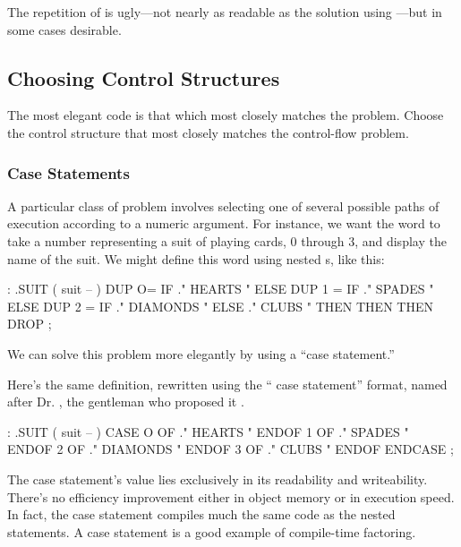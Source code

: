 The repetition of  is ugly---not nearly as readable as the
solution using ---but in some cases desirable.%
%
%

\subsection{Choosing Control Structures}%
\begin{tip}
The most elegant code is that which most closely matches the problem.
Choose the control structure that most closely matches the control-flow
problem.
\end{tip}%

\subsubsection{Case Statements}%
%

A particular class of problem involves selecting one of several possible
paths of execution according to a numeric argument. For instance, we
want the word  to take a number representing a suit of playing
cards, 0 through 3, and display the name of the suit. We might define this
word using nested s, like this:

\begin{Code}
: .SUIT ( suit -- )
  DUP  O=  IF ." HEARTS "   ELSE
  DUP  1 = IF ." SPADES "   ELSE
  DUP  2 = IF ." DIAMONDS " ELSE
              ." CLUBS "
  THEN THEN THEN  DROP ;
\end{Code}
We can solve this problem more elegantly by using a ``case statement.''

Here's the same definition, rewritten using the `` case
statement'' format, named after Dr. , the
gentleman who proposed it \cite{eaker}.

\begin{Code}
: .SUIT ( suit -- )
  CASE
  O OF   ." HEARTS "    ENDOF
  1 OF   ." SPADES "    ENDOF
  2 OF   ." DIAMONDS "  ENDOF
  3 OF   ." CLUBS "     ENDOF     ENDCASE ;
\end{Code}
The case statement's value lies exclusively in its readability and
writeability. There's no efficiency improvement either in object memory or
in execution speed. In fact, the case statement compiles much the same
code as the nested  statements. A case statement
is a good example of compile-time factoring.

